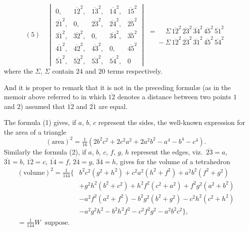 \documentclass[11pt]{article}
\begin{document}
\[ (5)\quad \begin{vmatrix}
0, & \overline{12}^{2}, & \overline{13}^{2}, & \overline{14}^{2}, & \overline{15}^{2} \\
\overline{21}^{2}, & 0, & \overline{23}^{2}, & \overline{24}^{2}, & \overline{25}^{2} \\
\overline{31}^{2}, & \overline{32}^{2}, & 0, & \overline{34}^{2}, & \overline{35}^{2} \\
\overline{41}^{2}, & \overline{42}^{2}, & \overline{43}^{2}, & 0, & \overline{45}^{2} \\
\overline{51}^{2}, & \overline{52}^{2}, & \overline{53}^{2}, & \overline{54}^{2}, & 0
\end{vmatrix}
\begin{array}{l}
=\phantom{-}\Sigma\, \overline{12}^{2}\, \overline{23}^{2}\, \overline{34}^{2}\, \overline{45}^{2}\, \overline{51}^{2}\\
\phantom{=}-\Sigma\, \overline{12}^{2}\, \overline{23}^{2}\, \overline{31}^{2}\, \overline{45}^{2}\, \overline{54}^{2}
\end{array} \]
where the $\Sigma$, $\Sigma$ contain $24$ and $20$ terms respectively.

\smallskip

And it is proper to remark that it is not in the preceding formul\ae{} (as in the
memoir above referred to in which $\overline{12}$ denotes a distance between two points $1$ and $2$)
assumed that $\overline{12}$ and $\overline{21}$ are equal.

\smallskip

The formula (1) gives, if $a$, $b$, $c$ represent the sides, the well-known expression for
the area of a triangle
\[ (\text{area})^{2}=\tfrac{1}{16}(2b^{2}c^{2}+2c^{2}a^{2}+2a^{2}b^{2}-a^{4}-b^{4}-c^{4}). \]
Similarly the formula (2), if $a$, $b$, $c$, $f$, $g$, $h$ represent the edges, viz.\ $\overline{23}=a$,
$\overline{31}=b$, $\overline{12}=c$, $\overline{14}=f$, $\overline{24}=g$, $\overline{34}=h$, gives for the volume of a tetrahedron
\begin{align*}
(\text{volume})^{2}=\tfrac{1}{144}\bigl\{ & b^{2}c^{2}(g^{2}+h^{2})+c^{2}a^{2}(h^{2}+f^{2})+a^{2}b^{2}(f^{2}+g^{2})\\
& +g^{2}h^{2}(b^{2}+c^{2})+h^{2}f^{2}(c^{2}+a^{2})+f^{2}g^{2}(a^{2}+b^{2})\\
& -a^{2}f^{2}(a^{2}+f^{2})-b^{2}g^{2}(b^{2}+g^{2})-c^{2}h^{2}(c^{2}+h^{2})\\
& -a^{2}g^{2}h^{2}-b^{2}h^{2}f^{2}-c^{2}f^{2}g^{2}-a^{2}b^{2}c^{2}\bigr\},\\
=\tfrac{1}{144}W \;\;\text{suppose.} &
\end{align*}
\end{document}
